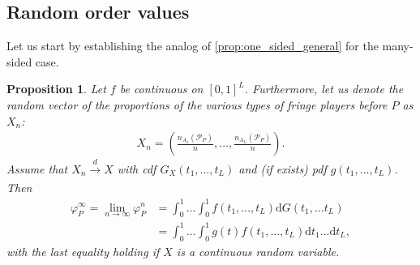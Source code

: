 \documentclass[a4paper]{article}
\newtheorem{proposition}{Proposition}
\newcommand{\dt}{\mathrm{d}t}
\newcommand{\dG}{\mathrm{d}G}
\begin{document}



\subsection{Random order values}

Let us start by establishing the analog of \cref{prop:one_sided_general} for the many-sided case.
\begin{proposition}
    \label{prop:many_sided_general}
    Let $f$ be continuous on $[0, 1]^L$. Furthermore, let us denote the random vector of the proportions of the various types of fringe players before $P$ as $X_n$:
    \begin{align*}
        X_n = \left( \frac{n_{A_1}(\mathcal{P}_P)}{n}, \dots, \frac{n_{A_L}(\mathcal{P}_P)}{n} \right).
    \end{align*}
    Assume that $X_n \xrightarrow[]{d} X$ with cdf $G_X(t_1, \dots, t_L)$ and (if exists) pdf $g(t_1, \dots, t_L)$.
    Then
    \begin{align*}
        \varphi_P^\infty = \lim_{n \to \infty} \varphi_P^n &= \int_0^1 \dots \int_0^1 f(t_1, \dots, t_L) \dG(t_1, \dots t_L) \\
        &= \int_0^1\dots \int_0^1 g(t) f(t_1, \dots, t_L) \dt_1 \dots \dt_L,
    \end{align*}
    with the last equality holding if $X$ is a continuous random variable.
\end{proposition}
\end{document}

